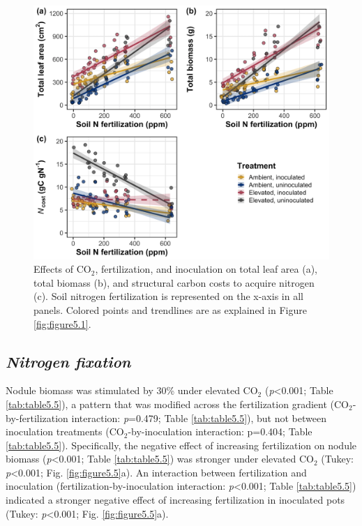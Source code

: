 \newpage
\begin{figure}
    \centering
    \includegraphics[width=\columnwidth]{ch5_NxCO2xI/figs/NxCO2xI_fig4_wholePlant.jpg}
    \caption[Effects of CO$_2$, fertilization, and inoculation on total leaf area, total biomass, and structural carbon costs to acquire nitrogen]{Effects of CO$_2$, fertilization, and inoculation on total leaf area (a), total biomass (b), and structural carbon costs to acquire nitrogen (c). Soil nitrogen fertilization is represented on the x-axis in all panels. Colored points and trendlines are as explained in Figure \ref{fig:figure5.1}.}
    \label{fig:figure5.4}
\end{figure}
\clearpage

\subsection{\textit{Nitrogen fixation}}
\noindent Nodule biomass was stimulated by 30\% under elevated CO$_2$ (\textit{p}<0.001; Table \ref{tab:table5.5}), a pattern that was modified across the fertilization gradient (CO$_2$-by-fertilization interaction: \textit{p}=0.479; Table \ref{tab:table5.5}), but not between inoculation treatments (CO$_2$-by-inoculation interaction: p=0.404; Table \ref{tab:table5.5}). Specifically, the negative effect of increasing fertilization on nodule biomass (\textit{p}<0.001; Table \ref{tab:table5.5}) was stronger under elevated CO$_2$ (Tukey: \textit{p}<0.001; Fig. \ref{fig:figure5.5}a). An interaction between fertilization and inoculation (fertilization-by-inoculation interaction: \textit{p}<0.001; Table \ref{tab:table5.5}) indicated a stronger negative effect of increasing fertilization in inoculated pots (Tukey: \textit{p}<0.001; Fig. \ref{fig:figure5.5}a).

